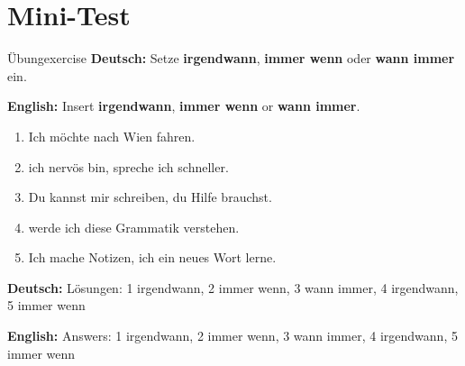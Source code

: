 \documentclass[a4paper,11pt]{article}
\newcommand{\GermanText}[1]{\textbf{Deutsch: }#1\par}
\newcommand{\EnglishText}[1]{{\small\color{SoftGray}\textbf{English: }#1\par}}
\begin{document}
\section{Mini-Test}

\begin{grammarentry}{Übung}{exercise}
\GermanText{Setze \textbf{irgendwann}, \textbf{immer wenn} oder \textbf{wann immer} ein.}
\EnglishText{Insert \textbf{irgendwann}, \textbf{immer wenn} or \textbf{wann immer}.}

\begin{enumerate}
    \item Ich möchte \underline{\hspace{3cm}} nach Wien fahren.
    \item \underline{\hspace{3cm}} ich nervös bin, spreche ich schneller.
    \item Du kannst mir schreiben, \underline{\hspace{3cm}} du Hilfe brauchst.
    \item \underline{\hspace{3cm}} werde ich diese Grammatik verstehen.
    \item Ich mache Notizen, \underline{\hspace{3cm}} ich ein neues Wort lerne.
\end{enumerate}

\GermanText{Lösungen: 1 irgendwann, 2 immer wenn, 3 wann immer, 4 irgendwann, 5 immer wenn}
\EnglishText{Answers: 1 irgendwann, 2 immer wenn, 3 wann immer, 4 irgendwann, 5 immer wenn}
\end{grammarentry}
\end{document}
